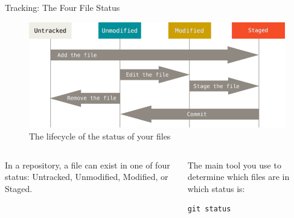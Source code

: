 \begin{frame}[fragile]{Tracking: The Four File Status}
  \begin{figure}
    \caption{The lifecycle of the status of your files}
    \includegraphics[width=\textwidth]{tracking/lifecycle}
  \end{figure}
  \begin{columns}[t]
    \begin{column}{0.5\textwidth}
      \footnotesize
In a repository, a file can exist in one of four status: Untracked, Unmodified,
Modified, or Staged.
    \end{column}
    \begin{column}{0.5\textwidth}
      \footnotesize
      The main tool you use to determine which files are in which status is:
        \begin{verbatim}
git status
        \end{verbatim}
    \end{column}
  \end{columns}
\end{frame}
